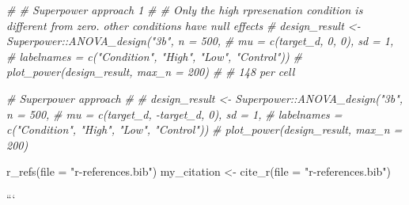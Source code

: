 \documentclass[
  english,
  man,floatsintext]{apa6}
\newenvironment{Shaded}{\begin{snugshade}}{\end{snugshade}}
\newcommand{\AttributeTok}[1]{\textcolor[rgb]{0.77,0.63,0.00}{#1}}
\newcommand{\CommentTok}[1]{\textcolor[rgb]{0.56,0.35,0.01}{\textit{#1}}}
\newcommand{\FunctionTok}[1]{\textcolor[rgb]{0.00,0.00,0.00}{#1}}
\newcommand{\NormalTok}[1]{#1}
\newcommand{\OtherTok}[1]{\textcolor[rgb]{0.56,0.35,0.01}{#1}}
\newcommand{\StringTok}[1]{\textcolor[rgb]{0.31,0.60,0.02}{#1}}
\begin{document}
\begin{Shaded}
\begin{Highlighting}[]
\CommentTok{\# \# Superpower approach 1}
\CommentTok{\# \# Only the high rpresenation condition is different from zero. other conditions have null effects}
\CommentTok{\# design\_result \textless{}{-} Superpower::ANOVA\_design("3b", n = 500, }
\CommentTok{\#                          mu = c(target\_d, 0, 0), sd = 1,}
\CommentTok{\#                          labelnames = c("Condition", "High", "Low", "Control"))}
\CommentTok{\# plot\_power(design\_result, max\_n = 200)}
\CommentTok{\# \# 148 per cell }
\end{Highlighting}
\end{Shaded}

\begin{Shaded}
\begin{Highlighting}[]
\CommentTok{\# Superpower approach}
\CommentTok{\# }
\CommentTok{\# design\_result \textless{}{-} Superpower::ANOVA\_design("3b", n = 500, }
\CommentTok{\#                          mu = c(target\_d, {-}target\_d, 0), sd = 1,}
\CommentTok{\#                          labelnames = c("Condition", "High", "Low", "Control"))}
\CommentTok{\# plot\_power(design\_result, max\_n = 200)}
\end{Highlighting}
\end{Shaded}

\begin{Shaded}
\begin{Highlighting}[]
\FunctionTok{r\_refs}\NormalTok{(}\AttributeTok{file =} \StringTok{"r{-}references.bib"}\NormalTok{)}
\NormalTok{my\_citation }\OtherTok{\textless{}{-}} \FunctionTok{cite\_r}\NormalTok{(}\AttributeTok{file =} \StringTok{"r{-}references.bib"}\NormalTok{)}
\end{Highlighting}
\end{Shaded}

```
\end{document}
